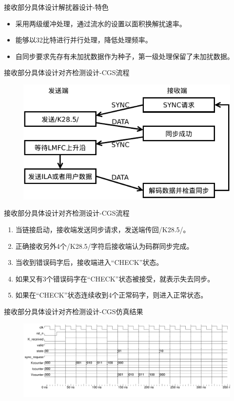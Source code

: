 \documentclass{beamer}
\begin{document}
\begin{frame}{接收部分具体设计}{解扰器设计-特色}
	\begin{itemize}
	\item 采用两级缓冲处理，通过流水的设置以面积换解扰速率。
	\item 能够以32比特进行并行处理，降低处理频率。
	\item 自同步要求先存有未加扰数据作为种子，第一级处理保留了未加扰数据。
	\end{itemize}
\end{frame}

\begin{frame}{接收部分具体设计}{对齐检测设计-CGS流程}
  \begin{figure}
  \centering
  \includegraphics[scale=0.8]{./img/cgs_subclass_1_2.pdf}
  \end{figure}
\end{frame}

\begin{frame}{接收部分具体设计}{对齐检测设计-CGS流程}
  \begin{enumerate}
  \item 当链接启动，接收端发送同步请求，发送端传回/K28.5/。
  \item 正确接收另外4个/K28.5/字符后接收端认为码群同步完成。
  \item 当收到错误码字后，接收端进入“CHECK”状态。
  \item 如果又有3个错误码字在“CHECK”状态被接受，就表示失去同步。
  \item 如果在“CHECK”状态连续收到4个正常码字，则进入正常状态。
  \end{enumerate}
\end{frame}

\begin{frame}{接收部分具体设计}{对齐检测设计-CGS仿真结果}
  \begin{figure}
  \includegraphics[scale=0.4]{./img/cgs_detection_wave.pdf}
  \end{figure}
\end{frame}
\end{document}
